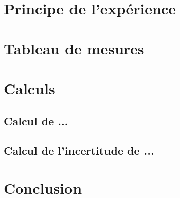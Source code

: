 \documentclass[11pt,a4paper]{report}
\begin{document}
	\section{Principe de l'expérience}
	\section{Tableau de mesures}
	\section{Calculs}
		\subsection{Calcul de ...}
		\subsection{Calcul de l'incertitude de ...}
	\section{Conclusion}
\end{document}
